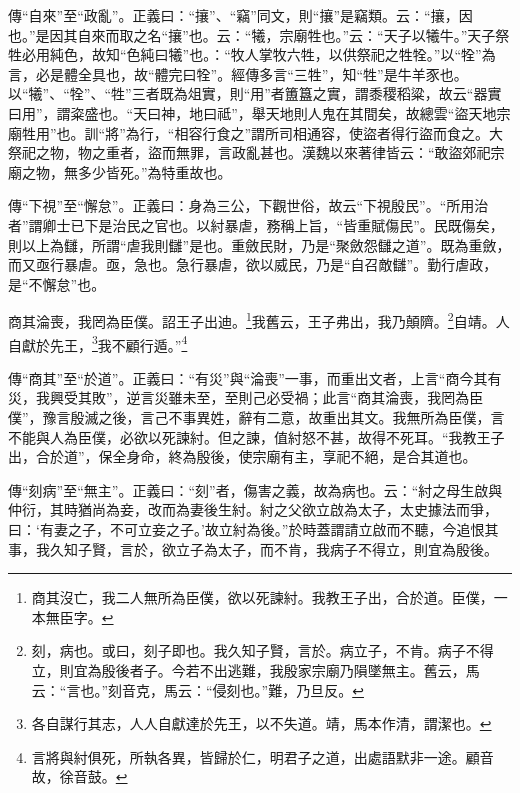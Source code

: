 {\noindent\zhuan{}\fzbyks 傳“自來”至“政亂”。正義曰：“攘”、“竊”同文，則“攘”是竊類。云：“攘，因也。”是因其自來而取之名“攘”也。云：“犧，宗廟牲也。”云：“天子以犧牛。”天子祭牲必用純色，故知“色純曰犧”也。：“牧人掌牧六牲，以供祭祀之牲牷。”以“牷”為言，必是體全具也，故“體完曰牷”。經傳多言“三牲”，知“牲”是牛羊豕也。以“犧”、“牷”、“牲”三者既為俎實，則“用”者簠簋之實，謂黍稷稻粱，故云“器實曰用”，謂粢盛也。“天曰神，地曰祗”，舉天地則人鬼在其間矣，故總雲“盜天地宗廟牲用”也。訓“將”為行，“相容行食之”謂所司相通容，使盜者得行盜而食之。大祭祀之物，物之重者，盜而無罪，言政亂甚也。漢魏以來著律皆云：“敢盜郊祀宗廟之物，無多少皆死。”為特重故也。 \par}

{\noindent\zhuan{}\fzbyks 傳“下視”至“懈怠”。正義曰：身為三公，下觀世俗，故云“下視殷民”。“所用治者”謂卿士已下是治民之官也。以紂暴虐，務稱上旨，“皆重賦傷民”。民既傷矣，則以上為讎，所謂“虐我則讎”是也。重斂民財，乃是“聚斂怨讎之道”。既為重斂，而又亟行暴虐。亟，急也。急行暴虐，欲以威民，乃是“自召敵讎”。勤行虐政，是“不懈怠”也。 \par}

商其淪喪，我罔為臣僕。詔王子出迪。\footnote{商其沒亡，我二人無所為臣僕，欲以死諫紂。我教王子出，合於道。臣僕，一本無臣字。}我舊云，王子弗出，我乃顛隮。\footnote{刻，病也。或曰，刻子即也。我久知子賢，言於。病立子，不肯。病子不得立，則宜為殷後者子。今若不出逃難，我殷家宗廟乃隕墜無主。舊云，馬云：“言也。”刻音克，馬云：“侵刻也。”難，乃旦反。}自靖。人自獻於先王，\footnote{各自謀行其志，人人自獻達於先王，以不失道。靖，馬本作清，謂潔也。}我不顧行遁。”\footnote{言將與紂俱死，所執各異，皆歸於仁，明君子之道，出處語默非一途。顧音故，徐音鼓。}

{\noindent\zhuan{}\fzbyks 傳“商其”至“於道”。正義曰：“有災”與“淪喪”一事，而重出文者，上言“商今其有災，我興受其敗”，逆言災雖未至，至則己必受禍；此言“商其淪喪，我罔為臣僕”，豫言殷滅之後，言己不事異姓，辭有二意，故重出其文。我無所為臣僕，言不能與人為臣僕，必欲以死諫紂。但之諫，值紂怒不甚，故得不死耳。“我教王子出，合於道”，保全身命，終為殷後，使宗廟有主，享祀不絕，是合其道也。 \par}

{\noindent\zhuan{}\fzbyks 傳“刻病”至“無主”。正義曰：“刻”者，傷害之義，故為病也。云：“紂之母生啟與仲衍，其時猶尚為妾，改而為妻後生紂。紂之父欲立啟為太子，太史據法而爭，曰：‘有妻之子，不可立妾之子。’故立紂為後。”於時蓋謂請立啟而不聽，今追恨其事，我久知子賢，言於，欲立子為太子，而不肯，我病子不得立，則宜為殷後。 \par}


